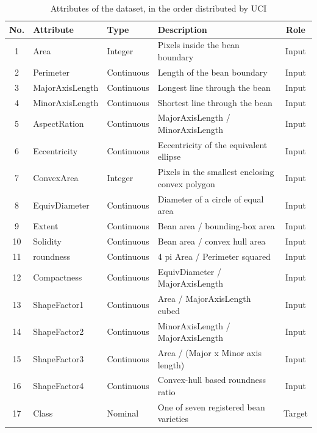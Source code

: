 \begin{table}[htbp]
\centering
\footnotesize
\caption{Attributes of the dataset, in the order distributed by UCI}
\label{tab:attributes}
\begin{tabular}{clp{}p{}c}
\toprule
No. & Attribute & Type & Description & Role \\
\midrule
1 & Area & Integer & Pixels inside the bean boundary & Input \\
2 & Perimeter & Continuous & Length of the bean boundary & Input \\
3 & MajorAxisLength & Continuous & Longest line through the bean & Input \\
4 & MinorAxisLength & Continuous & Shortest line through the bean & Input \\
5 & AspectRation & Continuous & MajorAxisLength / MinorAxisLength & Input \\
6 & Eccentricity & Continuous & Eccentricity of the equivalent ellipse & Input \\
7 & ConvexArea & Integer & Pixels in the smallest enclosing convex polygon & Input \\
8 & EquivDiameter & Continuous & Diameter of a circle of equal area & Input \\
9 & Extent & Continuous & Bean area / bounding-box area & Input \\
10 & Solidity & Continuous & Bean area / convex hull area & Input \\
11 & roundness & Continuous & 4 pi Area / Perimeter squared & Input \\
12 & Compactness & Continuous & EquivDiameter / MajorAxisLength & Input \\
13 & ShapeFactor1 & Continuous & Area / MajorAxisLength cubed & Input \\
14 & ShapeFactor2 & Continuous & MinorAxisLength / MajorAxisLength & Input \\
15 & ShapeFactor3 & Continuous & Area / (Major x Minor axis length) & Input \\
16 & ShapeFactor4 & Continuous & Convex-hull based roundness ratio & Input \\
17 & Class & Nominal & One of seven registered bean varieties & Target \\
\bottomrule
\end{tabular}
\end{table}
